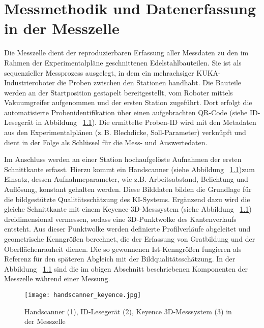 \chapter{Messmethodik und Datenerfassung in der Messzelle}

Die Messzelle dient der reproduzierbaren Erfassung aller Messdaten zu den im Rahmen der Experimentalpläne geschnittenen Edelstahlbauteilen. Sie ist als sequenzieller Messprozess ausgelegt, in dem ein mehrachsiger KUKA-Industrieroboter die Proben zwischen den Stationen handhabt. Die Bauteile werden an der Startposition gestapelt bereitgestellt, vom Roboter mittels Vakuumgreifer aufgenommen und der ersten Station zugeführt. Dort erfolgt die automatisierte Probenidentifikation über einen aufgebrachten QR-Code (siehe ID-Lesegerät in Abbildung ~\ref{fig:handscanner_barcodelesegerät_keyence}). Die ermittelte Proben-ID wird mit den Metadaten aus den Experimentalplänen (z.\,B. Blechdicke, Soll-Parameter) verknüpft und dient in der Folge als Schlüssel für die Mess- und Auswertedaten.

Im Anschluss werden an einer Station hochaufgelöste Aufnahmen der ersten Schnittkante erfasst. Hierzu kommt ein Handscanner (siehe Abbildung ~\ref{fig:handscanner_barcodelesegerät_keyence})zum Einsatz, dessen Aufnahmeparameter, wie z.B. Arbeitsabstand, Belichtung und  Auflösung, konstant gehalten werden. Diese Bilddaten bilden die Grundlage für die bildgestützte Qualitätsschätzung des KI-Systems. Ergänzend dazu wird die gleiche Schnittkante mit einem Keyence-3D-Messsystem (siehe Abbildung ~\ref{fig:handscanner_barcodelesegerät_keyence}) dreidimensional vermessen, sodass eine 3D-Punktwolke des Kantenverlaufs entsteht. Aus dieser Punktwolke werden definierte Profilverläufe abgeleitet und geometrische Kenngrößen berechnet, die der Erfassung von Gratbildung und der Oberflächenrauheit dienen. Die so gewonnenen Ist-Kenngrößen fungieren als Referenz für den späteren Abgleich mit der Bildqualitätsschätzung. In der Abbildung ~\ref{fig:handscanner_barcodelesegerät_keyence} sind die im obigen Abschnitt beschriebenen Komponenten der Messzelle während einer Messung.

\begin{figure}[htbp]
    \centering
    \texttt{[image: handscanner\_keyence.jpg]}
    \caption{Handscanner (1), ID-Lesegerät (2), Keyence 3D-Messsystem (3) in der Messzelle}
    \label{fig:handscanner_barcodelesegerät_keyence}
\end{figure}

\newpage


